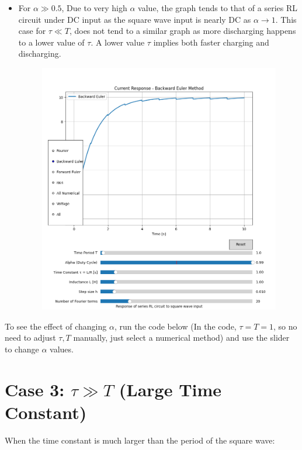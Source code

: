 \documentclass[12pt,a4paper]{report}
\begin{document}
\begin{itemize}
\begin{itemize}
        \item For $\alpha \gg 0.5$, Due to very high $\alpha$ value, the graph tends to that of a series RL circuit under DC input as the square wave input is nearly DC as $\alpha \rightarrow 1$. This case for $\tau \ll T$, does not tend to a similar graph as more discharging happens to a lower value of $\tau$. A lower value $\tau$ implies both faster charging and discharging. 
        \begin{figure}[h!]
	\centering
	\includegraphics[scale=0.6]{figs/tau=T-3.png}
        \end{figure}
    \end{itemize}
    To see the effect of changing $\alpha$, run the code below (In the code, $\tau = T = 1$, so no need to adjust $\tau, T$ manually, just select a numerical method) and use the slider to change $\alpha$ values.
\end{itemize}

\section{Case 3: $\tau \gg T$ (Large Time Constant)}
When the time constant is much larger than the period of the square wave:
\end{document}
